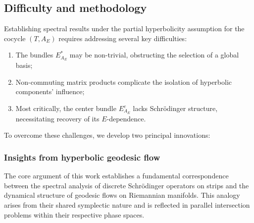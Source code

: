 \documentclass[11pt]{amsart}
\theoremstyle{remark}
\theoremstyle{definition}
\begin{document}
\subsection{Difficulty and methodology}\label{method}

Establishing spectral results under the partial hyperbolicity assumption for the cocycle \((T, A_E)\) requires addressing several key difficulties:
\begin{enumerate}
    \item The bundles \(E_{A_E}^{*}\) may be non-trivial, obstructing the selection of a global basis;
    \item Non-commuting matrix products complicate the isolation of hyperbolic components' influence;
    \item Most critically, the center bundle \(E_{A_E}^{c}\) lacks Schr\"odinger structure, necessitating recovery of its \(E\)-dependence.
\end{enumerate}
To overcome these challenges, we develop two principal innovations:

\subsubsection{Insights from hyperbolic geodesic flow}\label{hgf}
The core argument of this work establishes a fundamental correspondence between the spectral analysis of discrete Schr\"odinger operators on strips and the dynamical structure of geodesic flows on Riemannian manifolds. This analogy arises from their shared symplectic nature and is reflected in parallel intersection problems within their respective phase spaces.
\end{document}
